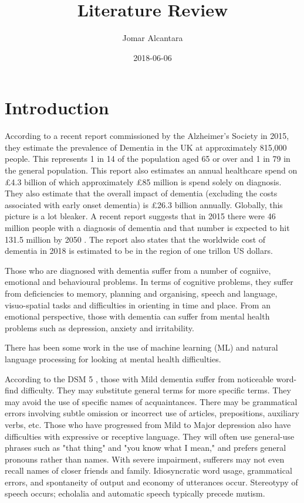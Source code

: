 \documentclass[a4paper]{article}
\title{Literature Review}
\date{2018-06-06}
\author{Jomar Alcantara}
\begin{document}
\maketitle
\newpage
\tableofcontents
\newpage
\section{Introduction}
\par
According to a recent report commissioned by the Alzheimer's Society in 2015, they estimate the prevalence of Dementia in the UK at approximately 815,000 people. This represents 1 in 14 of the population aged 65 or over and 1 in 79 in the general population. This report also estimates an annual healthcare spend on £4.3 billion of which approximately £85 million is spend solely on diagnosis. They also estimate that the overall impact of dementia (excluding the costs associated with early onset dementia) is £26.3 billion annually. Globally, this picture is a lot bleaker. A recent report suggests that in 2015 there were 46 million people with a diagnosis of dementia and that number is expected to hit 131.5 million by 2050 \cite{Prince2015}. The report also states that the worldwide cost of dementia in 2018 is estimated to be in the region of one trillon US dollars. \newline
\par
Those who are diagnosed with dementia suffer from a number of cogniive, emotional and behavioural problems. In terms of cognitive problems, they suffer from deficiencies to memory, planning and organising, speech and language, visuo-spatial tasks and difficulties in orienting in time and place. From an emotional perspective, those with dementia can suffer from mental health problems such as depression, anxiety and irritability.  \newline
\par
There has been some work in the use of machine learning (ML) and natural language processing for looking at mental health difficulties.\newline
\par
According to the DSM 5 \cite{AmericanPsychiatricAssociation2013}, those with Mild dementia suffer from noticeable word-find difficulty. They may substitute general terms for more specific terms. They may avoid the use of specific names of acquaintances. There may be grammatical errors involving subtle omission or incorrect use of articles, prepositions, auxiliary verbs, etc. Those who have progressed from Mild to Major depression also have difficulties with expressive or receptive language. They will often use general-use phrases such as "that thing" and "you know what I mean," and prefers general pronouns rather than names. With severe impairment, sufferers may not even recall names of closer friends and family. Idiosyncratic word usage, grammatical errors, and spontaneity of output and economy of utterances occur. Stereotypy of speech occurs; echolalia and automatic speech typically precede mutism.\newline
\end{document}
